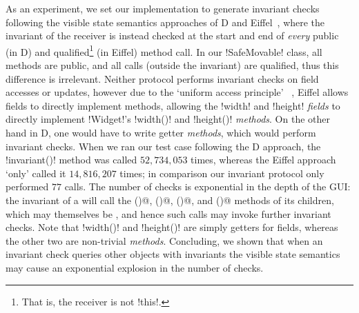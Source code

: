 As an experiment, we set our implementation to generate invariant checks following the  visible state semantics approaches of D and Eiffel~\cite{Alexandrescu:2010:DPL:1875434,Meyer:1992:EL:129093},
where the invariant of the receiver is instead checked at the start and end of \emph{every} 
public (in D) and qualified\footnote{That is, the receiver is not \Q!this!.} (in Eiffel) method call.
In our \Q!SafeMovable! class, all methods are public, and all calls (outside the invariant) are qualified, thus this difference is irrelevant. Neither protocol performs invariant checks on field accesses or updates,
however due to the `uniform access principle'~\cite{Meyer:1992:EL:129093}%
, Eiffel allows fields to directly implement methods,
 allowing the \Q!width! and \Q!height! \emph{fields} to directly implement \Q!Widget!'s \Q!width()! and \Q!height()! \emph{methods}. On the other hand in D, one would have to write getter \emph{methods}, which would perform invariant checks.
When we ran our test case following the D approach, the \Q!invariant()! method was called $52,734,053$ times, whereas the Eiffel approach `only' called it $14,816,207$ times; %
in comparison our invariant protocol only performed $77$ calls. The number of checks is exponential in the depth of the GUI: the invariant of a \Q@SafeMovable@ will call the \Q@width()@, \Q@height()@, \Q@left()@, and \Q@top()@ methods of its children, which may themselves be \Q@SafeMovable@s, and hence such calls may invoke further invariant checks. Note that \Q!width()! and \Q!height()! are simply getters for fields, whereas the other two are non-trivial \emph{methods}.
Concluding, we shown that when an invariant check queries other objects with invariants the visible state semantics may cause an exponential explosion in the number of checks.

